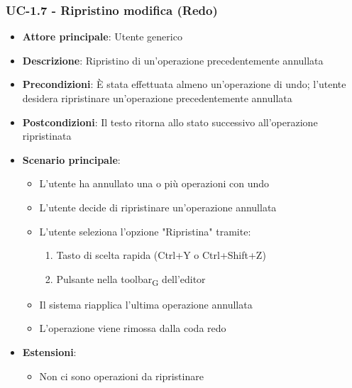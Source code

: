 \documentclass[11pt,a4paper]{article}
\newcommand{\gls}[1]{#1\textsubscript{G}}
\begin{document}
\subsubsection{UC-1.7 - Ripristino modifica (Redo)}
\begin{itemize}
    \item \textbf{Attore principale}: Utente generico
    \item \textbf{Descrizione}: Ripristino di un'operazione precedentemente annullata
    \item \textbf{Precondizioni}: È stata effettuata almeno un'operazione di undo; l'utente desidera ripristinare un'operazione precedentemente annullata
    \item \textbf{Postcondizioni}: Il testo ritorna allo stato successivo all'operazione ripristinata
    \item \textbf{Scenario principale}:
        \begin{itemize}
            \item L'utente ha annullato una o più operazioni con undo
            \item L'utente decide di ripristinare un'operazione annullata
            \item L'utente seleziona l'opzione "Ripristina" tramite:
                \begin{enumerate}
                    \item Tasto di scelta rapida (Ctrl+Y o Ctrl+Shift+Z)
                    \item Pulsante nella \gls{toolbar} dell'editor
                \end{enumerate}
            \item Il sistema riapplica l'ultima operazione annullata
            \item L'operazione viene rimossa dalla coda redo
        \end{itemize}
    \item \textbf{Estensioni}:
        \begin{itemize}
            \item Non ci sono operazioni da ripristinare
        \end{itemize}
\end{itemize}
\end{document}
